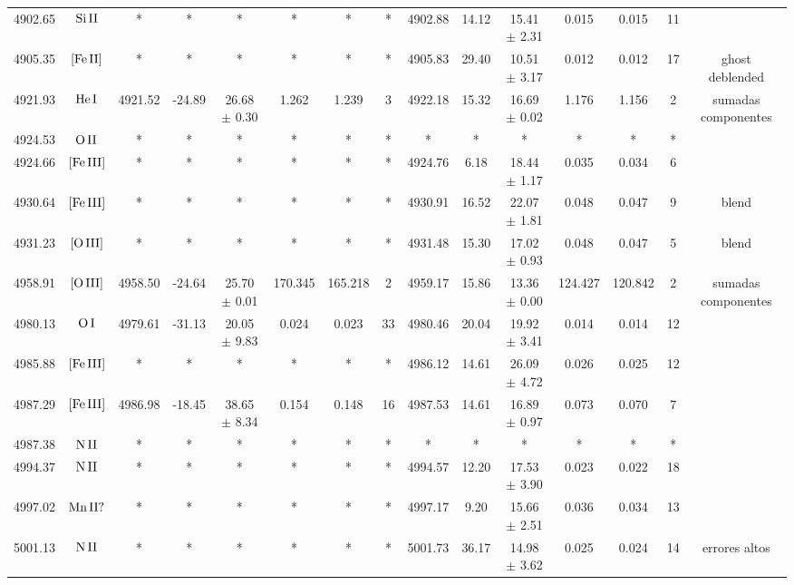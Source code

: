 \documentclass{article}
\begin{document}
\begin{table*}
\begin{adjustbox}{width=\textwidth}
\begin{tabular}{ccccccccccccccc}
4902.65 & $\mbox{Si}\thinspace \mbox{II}$ & * & * & * & * & * & * & 4902.88 & 14.12 & 15.41 $\pm$ 2.31 & 0.015 & 0.015 & 11 &  \\
4905.35 & $\mbox{[Fe}\thinspace \mbox{II]}$ & * & * & * & * & * & * & 4905.83 & 29.40 & 10.51 $\pm$ 3.17 & 0.012 & 0.012 & 17 &  ghost deblended \\
4921.93 & $\mbox{He}\thinspace \mbox{I}$ & 4921.52 & -24.89 & 26.68 $\pm$ 0.30 & 1.262 & 1.239 & 3 & 4922.18 & 15.32 & 16.69 $\pm$ 0.02 & 1.176 & 1.156 & 2 &  sumadas componentes \\
4924.53 & $\mbox{O}\thinspace \mbox{II}$ & * & * & * & * & * & * & * & * & * & * & * & * &  \\
4924.66 & $\mbox{[Fe}\thinspace \mbox{III]}$ & * & * & * & * & * & * & 4924.76 & 6.18 & 18.44 $\pm$ 1.17 & 0.035 & 0.034 & 6 &  \\
4930.64 & $\mbox{[Fe}\thinspace \mbox{III]}$ & * & * & * & * & * & * & 4930.91 & 16.52 & 22.07 $\pm$ 1.81 & 0.048 & 0.047 & 9 &  blend \\
4931.23 & $\mbox{[O}\thinspace \mbox{III]}$ & * & * & * & * & * & * & 4931.48 & 15.30 & 17.02 $\pm$ 0.93 & 0.048 & 0.047 & 5 &  blend \\
4958.91 & $\mbox{[O}\thinspace \mbox{III]}$ & 4958.50 & -24.64 & 25.70 $\pm$ 0.01 & 170.345 & 165.218 & 2 & 4959.17 & 15.86 & 13.36 $\pm$ 0.00 & 124.427 & 120.842 & 2 &  sumadas componentes \\
4980.13 & $\mbox{O}\thinspace \mbox{I}$ & 4979.61 & -31.13 & 20.05 $\pm$ 9.83 & 0.024 & 0.023 & 33 & 4980.46 & 20.04 & 19.92 $\pm$ 3.41 & 0.014 & 0.014 & 12 &  \\
4985.88 & $\mbox{[Fe}\thinspace \mbox{III]}$ & * & * & * & * & * & * & 4986.12 & 14.61 & 26.09 $\pm$ 4.72 & 0.026 & 0.025 & 12 &  \\
4987.29 & $\mbox{[Fe}\thinspace \mbox{III]}$ & 4986.98 & -18.45 & 38.65 $\pm$ 8.34 & 0.154 & 0.148 & 16 & 4987.53 & 14.61 & 16.89 $\pm$ 0.97 & 0.073 & 0.070 & 7 &  \\
4987.38 & $\mbox{N}\thinspace \mbox{II}$ & * & * & * & * & * & * & * & * & * & * & * & * &  \\
4994.37 & $\mbox{N}\thinspace \mbox{II}$ & * & * & * & * & * & * & 4994.57 & 12.20 & 17.53 $\pm$ 3.90 & 0.023 & 0.022 & 18 &  \\
4997.02 & $\mbox{Mn}\thinspace \mbox{II?}$ & * & * & * & * & * & * & 4997.17 & 9.20 & 15.66 $\pm$ 2.51 & 0.036 & 0.034 & 13 &  \\
5001.13 & $\mbox{N}\thinspace \mbox{II}$ & * & * & * & * & * & * & 5001.73 & 36.17 & 14.98 $\pm$ 3.62 & 0.025 & 0.024 & 14 &  errores altos \\

\end{tabular}
\end{adjustbox}
\end{table*}
\end{document}
